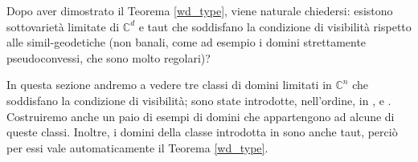 Dopo aver dimostrato il Teorema \ref{wd_type}, viene naturale chiedersi: esistono sottovarietà limitate di $\mathbb{C}^d$ e taut che soddisfano la condizione di visibilità rispetto alle simil-geodetiche (non banali, come ad esempio i domini strettamente pseudoconvessi, che sono molto regolari)?

In questa sezione andremo a vedere tre classi di domini limitati in $\mathbb{C}^n$ che soddisfano la condizione di visibilità; sono state introdotte, nell'ordine, in \cite{BZ1}, \cite{BM} e \cite{CMS}. Costruiremo anche un paio di esempi di domini che appartengono ad alcune di queste classi. Inoltre, i domini della classe introdotta in \cite{BM} sono anche taut, perciò per essi vale automaticamente il Teorema \ref{wd_type}.
